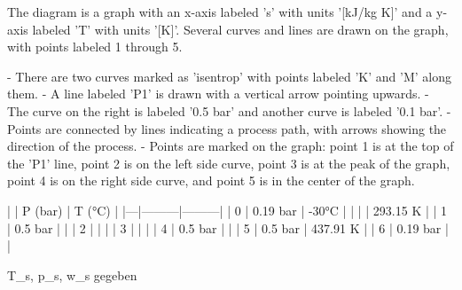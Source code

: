 The diagram is a graph with an x-axis labeled 's' with units '[kJ/kg K]' and a y-axis labeled 'T' with units '[K]'. Several curves and lines are drawn on the graph, with points labeled 1 through 5. 

- There are two curves marked as 'isentrop' with points labeled 'K' and 'M' along them.
- A line labeled 'P1' is drawn with a vertical arrow pointing upwards.
- The curve on the right is labeled '0.5 bar' and another curve is labeled '0.1 bar'.
- Points are connected by lines indicating a process path, with arrows showing the direction of the process.
- Points are marked on the graph: point 1 is at the top of the 'P1' line, point 2 is on the left side curve, point 3 is at the peak of the graph, point 4 is on the right side curve, and point 5 is in the center of the graph.

|   | P (bar) | T (°C)  |
|---|---------|---------|
| 0 | 0.19 bar | -30°C   |
|   |          | 293.15 K |
| 1 | 0.5 bar  |         |
| 2 |          |         |
| 3 |          |         |
| 4 | 0.5 bar  |         |
| 5 | 0.5 bar  | 437.91 K |
| 6 | 0.19 bar |         |

T_s, p_s, w_s gegeben